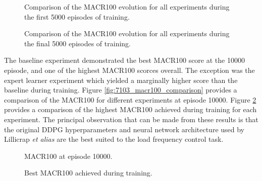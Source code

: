 \begin{figure}[h]
	\centering
	
	
	\caption[MACR100 comparison for first 5000 episodes]{Comparison of the MACR100 evolution for all experiments during the first 5000 episodes of training.}\label{fig:7101_MACR100_first}
	
	\vspace{0.5cm}
	
	
	\caption[MACR100 comparison for last 5000 episodes]{Comparison of the MACR100 evolution for all experiments during the final 5000 episodes of training.}\label{fig:7102_MACR100_second}
\end{figure}

\clearpage

The baseline experiment demonstrated the best MACR100 score at the 10000 episode, and one of the highest MACR100 scorces overall. The exception was the expert learner experiment which yielded a marginally higher score than the baseline during training. Figure \ref{fig:7103_macr100_comparison} provides a comparison of the MACR100 for different experiments at episode 10000. Figure \ref{fig:7104_macr100_comparison} provides a comparison of the highest MACR100 achieved during training for each experiment. The principal observation that can be made from these results is that the original DDPG hyperparameters and neural network architecture used by Lillicrap \textit{et alias} are the best suited to the load frequency control task.

\begin{figure}[h]
	\begin{minipage}{0.50\textwidth}
		\centering
		\resizebox{7cm}{!}{}
		\caption{MACR100 at episode 10000.}\label{fig:7103_macr100_comparison}
	\end{minipage}
	\hspace{0.25cm}
	\begin{minipage}{0.50\textwidth}
		\resizebox{7cm}{!}{}
		\caption{Best MACR100 achieved during training.}\label{fig:7104_macr100_comparison}
	\end{minipage}
\end{figure}
 
